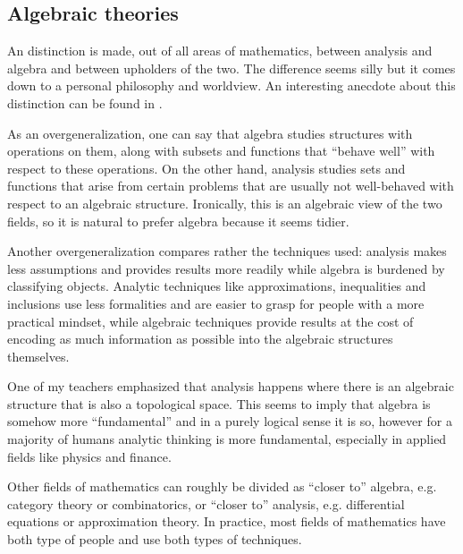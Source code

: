 \subsection{Algebraic theories}\label{subsec:algebraic_theories}

\begin{remark}\label{remark:algebra_vs_analysis}
  An distinction is made, out of all areas of mathematics, between analysis and algebra and between upholders of the two. The difference seems silly but it comes down to a personal philosophy and worldview. An interesting anecdote about this distinction can be found in \cite{Tilly2010}.

  As an overgeneralization, one can say that algebra studies structures with operations on them, along with subsets and functions that \enquote{behave well} with respect to these operations. On the other hand, analysis studies sets and functions that arise from certain problems that are usually not well-behaved with respect to an algebraic structure. Ironically, this is an algebraic view of the two fields, so it is natural to prefer algebra because it seems tidier.

  Another overgeneralization compares rather the techniques used: analysis makes less assumptions and provides results more readily while algebra is burdened by classifying objects. Analytic techniques like approximations, inequalities and inclusions use less formalities and are easier to grasp for people with a more practical mindset, while algebraic techniques provide results at the cost of encoding as much information as possible into the algebraic structures themselves.

  One of my teachers emphasized that analysis happens where there is an algebraic structure that is also a topological space. This seems to imply that algebra is somehow more \enquote{fundamental} and in a purely logical sense it is so, however for a majority of humans analytic thinking is more fundamental, especially in applied fields like physics and finance.

  Other fields of mathematics can roughly be divided as \enquote{closer to} algebra, e.g. category theory or combinatorics, or \enquote{closer to} analysis, e.g. differential equations or approximation theory. In practice, most fields of mathematics have both type of people and use both types of techniques.
\end{remark}

